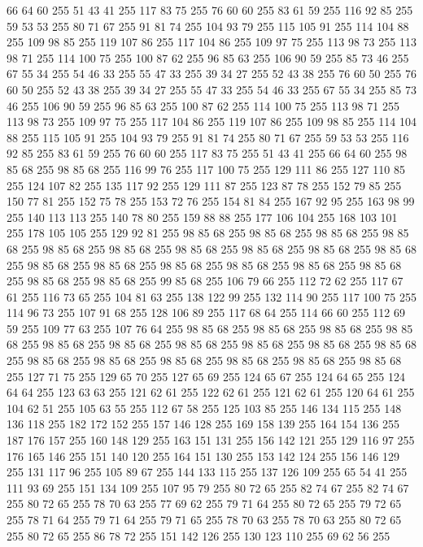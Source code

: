 66 64 60 255 51 43 41 255 117 83 75 255 76 60 60 255 83 61 59 255 116 92 85 255 59 53 53 255 80 71 67 255 91 81 74 255 104 93 79 255 115 105 91 255 114 104 88 255 109 98 85 255 119 107 86 255 117 104 86 255 109 97 75 255 113 98 73 255 113 98 71 255 114 100 75 255 100 87 62 255 96 85 63 255 106 90 59 255 85 73 46 255 67 55 34 255 54 46 33 255 55 47 33 255 39 34 27 255 52 43 38 255 76 60 50 255 76 60 50 255 52 43 38 255 39 34 27 255 55 47 33 255 54 46 33 255 67 55 34 255 85 73 46 255 106 90 59 255 96 85 63 255 100 87 62 255 114 100 75 255 113 98 71 255 113 98 73 255 109 97 75 255 117 104 86 255 119 107 86 255 109 98 85 255 114 104 88 255 115 105 91 255 104 93 79 255 91 81 74 255 80 71 67 255 59 53 53 255 116 92 85 255 83 61 59 255 76 60 60 255 117 83 75 255 51 43 41 255 66 64 60 255 98 85 68 255 98 85 68 255 116 99 76 255 117 100 75 255 129 111 86 255 127 110 85 255
124 107 82 255 135 117 92 255 129 111 87 255 123 87 78 255 152 79 85 255 150 77 81 255 152 75 78 255 153 72 76 255 154 81 84 255 167 92 95 255 163 98 99 255 140 113 113 255 140 78 80 255 159 88 88 255 177 106 104 255 168 103 101 255 178 105 105 255 129 92 81 255 98 85 68 255 98 85 68 255 98 85 68 255 98 85 68 255 98 85 68 255 98 85 68 255 98 85 68 255 98 85 68 255 98 85 68 255 98 85 68 255 98 85 68 255 98 85 68 255 98 85 68 255 98 85 68 255 98 85 68 255 98 85 68 255 98 85 68 255 98 85 68 255 99 85 68 255 106 79 66 255 112 72 62 255 117 67 61 255 116 73 65 255 104 81 63 255 138 122 99 255 132 114 90 255 117 100 75 255 114 96 73 255 107 91 68 255 128 106 89 255 117 68 64 255 114 66 60 255 112 69 59 255 109 77 63 255 107 76 64 255 98 85 68 255 98 85 68 255 98 85 68 255 98 85 68 255 98 85 68 255 98 85 68 255 98 85 68 255 98 85 68 255 98 85 68 255 98 85 68 255 98 85 68 255
98 85 68 255 98 85 68 255 98 85 68 255 98 85 68 255 98 85 68 255 127 71 75 255 129 65 70 255 127 65 69 255 124 65 67 255 124 64 65 255 124 64 64 255 123 63 63 255 121 62 61 255 122 62 61 255 121 62 61 255 120 64 61 255 104 62 51 255 105 63 55 255 112 67 58 255 125 103 85 255 146 134 115 255 148 136 118 255 182 172 152 255 157 146 128 255 169 158 139 255 164 154 136 255 187 176 157 255 160 148 129 255 163 151 131 255 156 142 121 255 129 116 97 255 176 165 146 255 151 140 120 255 164 151 130 255 153 142 124 255 156 146 129 255 131 117 96 255 105 89 67 255 144 133 115 255 137 126 109 255 65 54 41 255 111 93 69 255 151 134 109 255 107 95 79 255 80 72 65 255 82 74 67 255 82 74 67 255 80 72 65 255 78 70 63 255 77 69 62 255 79 71 64 255 80 72 65 255 79 72 65 255 78 71 64 255 79 71 64 255 79 71 65 255 78 70 63 255 78 70 63 255 80 72 65 255 80 72 65 255 86 78 72 255 151 142 126 255 130 123 110 255 69 62 56 255
